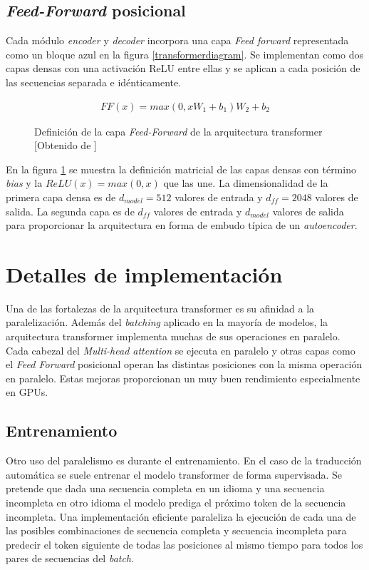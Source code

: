 \subsection{\textit{Feed-Forward} posicional}\label{transfffpos}
Cada módulo \textit{encoder} y \textit{decoder} incorpora una capa \textit{Feed forward} representada como un bloque azul en la figura \ref{transformerdiagram}. Se implementan como dos capas densas con una activación ReLU entre ellas y se aplican a cada posición de las secuencias separada e idénticamente.

\begin{figure}[H]
    \begin{align*}
        FF(x) = max(0, xW_{1}+b_{1})W_{2}+b_{2}
    \end{align*}
    \caption{Definición de la capa \textit{Feed-Forward} de la arquitectura transformer [Obtenido de \cite{Vaswani2017Jun}]}\label{transformerffposform}
\end{figure}

En la figura \ref{transformerffposform} se muestra la definición matricial de las capas densas con término \textit{bias} y la $ReLU(x)=max(0,x)$ que las une.
La dimensionalidad de la primera capa densa es de $d_{model}=512$ valores de entrada y $d_{ff}=2048$ valores de salida. La segunda capa es de $d_{ff}$ valores de entrada y $d_{model}$ valores de salida para proporcionar la arquitectura en forma de embudo típica de un \textit{autoencoder}.

\section{Detalles de implementación}
Una de las fortalezas de la arquitectura transformer es su afinidad a la paralelización. Además del \textit{batching} aplicado en la mayoría de modelos, la arquitectura transformer implementa muchas de sus operaciones en paralelo. Cada cabezal del \textit{Multi-head attention} se ejecuta en paralelo y otras capas como el \textit{Feed Forward} posicional operan las distintas posiciones con la misma operación en paralelo. Estas mejoras proporcionan un muy buen rendimiento especialmente en GPUs.
\subsection{Entrenamiento}
Otro uso del paralelismo es durante el entrenamiento. En el caso de la traducción automática se suele entrenar el modelo transformer de forma supervisada. Se pretende que dada una secuencia completa en un idioma y una secuencia incompleta en otro idioma el modelo prediga el próximo token de la secuencia incompleta.
Una implementación eficiente paraleliza la ejecución de cada una de las posibles combinaciones de secuencia completa y secuencia incompleta para predecir el token siguiente de todas las posiciones al mismo tiempo para todos los pares de secuencias del \textit{batch}.

